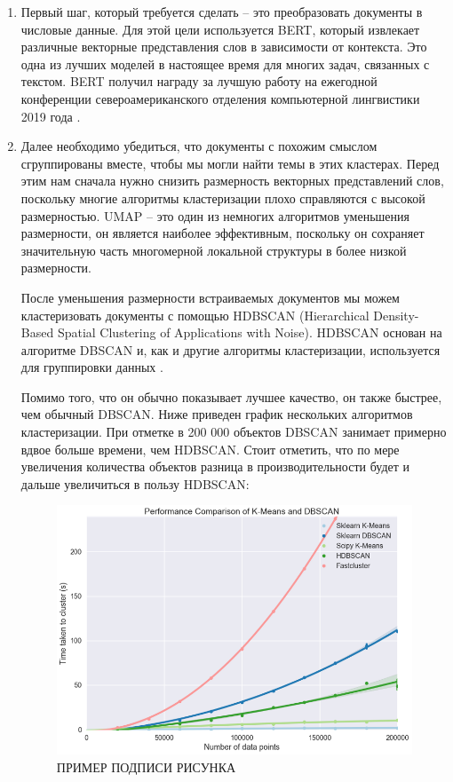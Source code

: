 \begin{enumerate}

\item Первый шаг, который требуется сделать -- это преобразовать документы в числовые данные. Для этой цели используется BERT, который извлекает различные векторные представления слов в зависимости от контекста. Это одна из лучших моделей в настоящее время для многих задач, связанных с текстом. BERT получил награду за лучшую работу на ежегодной конференции североамериканского отделения  компьютерной лингвистики 2019 года \cite{bib_1} \cite{bib_2}.

\item Далее необходимо убедиться, что документы с похожим смыслом сгруппированы вместе, чтобы мы могли найти темы в этих кластерах. Перед этим нам сначала нужно снизить размерность векторных представлений слов, поскольку многие алгоритмы кластеризации плохо справляются с высокой размерностью. 
UMAP -- это один из немногих алгоритмов уменьшения размерности, он является наиболее эффективным,
 поскольку он сохраняет значительную часть многомерной локальной структуры в более низкой размерности. 


После уменьшения размерности встраиваемых документов  мы можем кластеризовать документы с помощью HDBSCAN (Hierarchical Density-Based Spatial Clustering of Applications with Noise).
HDBSCAN основан на алгоритме DBSCAN и, как и другие алгоритмы кластеризации, используется для группировки данных \cite{bib_3}.

Помимо того, что он обычно показывает лучшее качество, он также быстрее, чем обычный DBSCAN. Ниже приведен график нескольких алгоритмов кластеризации. При отметке в 200 000 объектов DBSCAN занимает примерно вдвое больше времени, чем HDBSCAN. Стоит отметить, что по мере увеличения количества объектов разница в производительности будет и дальше увеличиться в пользу HDBSCAN:
\newline

\begin{figure}
\centering
\includegraphics[scale=0.5]{pics/clustering-comparison.png}
\caption{ПРИМЕР ПОДПИСИ РИСУНКА}
\end{figure}


\end{enumerate}
